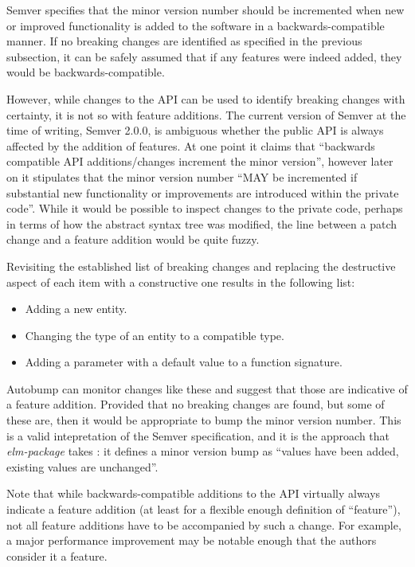 \documentclass{l4proj}
\begin{document}
Semver specifies that the minor version number should be incremented
when new or improved functionality is added to the software in a
backwards-compatible manner. If no breaking changes are identified as
specified in the previous subsection, it can be safely assumed that if any
features were indeed added, they would be backwards-compatible.

However, while changes to the API can be used to identify breaking
changes with certainty, it is not so with feature additions. The
current version of Semver at the time of writing, Semver 2.0.0, is
ambiguous whether the public API is always affected by the addition of
features. At one point it claims that ``backwards compatible API
additions/changes increment the minor version'', however later on it
stipulates that the minor version number ``MAY be incremented if
substantial new functionality or improvements are introduced within
the private code''.
While it would be possible to inspect changes to the private code,
perhaps in terms of how the abstract syntax tree was modified, the
line between a patch change and a feature addition would be quite
fuzzy.

Revisiting the established list of breaking changes and replacing
the destructive aspect of each item with a constructive one results in
the following list:

\begin{itemize}
\item Adding a new entity.
\item Changing the type of an entity to a compatible type.
\item Adding a parameter with a default value to a function signature.
\end{itemize}

Autobump can monitor changes like these and suggest that those are
indicative of a feature addition. Provided that no breaking changes
are found, but some of these are, then it would be appropriate to bump
the minor version number. This is a valid intepretation of the Semver
specification, and it is the approach that \textit{elm-package} takes
\cite{ElmPackageVR}: it defines a minor version bump as ``values have
been added, existing values are unchanged''.

Note that while backwards-compatible additions to the API virtually
always indicate a feature addition (at least for a flexible enough
definition of ``feature''), not all feature additions have to be
accompanied by such a change. For example, a major performance
improvement may be notable enough that the authors consider it a
feature.
\end{document}
